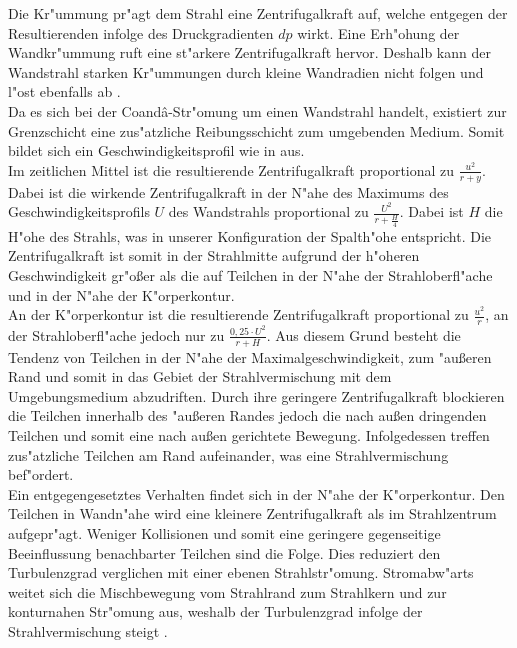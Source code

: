 Die Kr"ummung pr"agt dem Strahl eine Zentrifugalkraft auf, welche entgegen der Resultierenden infolge des Druckgradienten $dp$ wirkt. Eine Erh"ohung der Wandkr"ummung ruft eine st"arkere Zentrifugalkraft hervor. Deshalb kann der Wandstrahl starken Kr"ummungen durch kleine Wandradien nicht folgen und l"ost ebenfalls ab \cite{Riedel.1971}.\\
Da es sich bei der Coand\^{a}-Str"omung um einen Wandstrahl handelt, existiert zur Grenzschicht eine zus"atzliche Reibungsschicht zum umgebenden Medium. Somit bildet sich ein Geschwindigkeitsprofil wie in  aus.\\
Im zeitlichen Mittel ist die resultierende Zentrifugalkraft proportional zu $\frac{u^2}{r+y}$. Dabei ist die wirkende Zentrifugalkraft in der N"ahe des Maximums des Geschwindigkeitsprofils $U$ des Wandstrahls proportional zu $\frac{U^2}{r+\frac{H}{4}}$. Dabei ist $H$ die H"ohe des Strahls, was in unserer Konfiguration der Spalth"ohe entspricht. Die Zentrifugalkraft ist somit in der Strahlmitte aufgrund der h"oheren Geschwindigkeit gr"o\ss{}er als die auf Teilchen in der N"ahe der Strahloberfl"ache und in der N"ahe der K"orperkontur.\\
An der K"orperkontur ist die resultierende Zentrifugalkraft proportional zu $\frac{u^2}{r}$, an der Strahloberfl"ache jedoch nur zu $\frac{0,25 \cdot U^2}{r + H}$. Aus diesem Grund besteht die Tendenz von Teilchen in der N"ahe der Maximalgeschwindigkeit, zum "au\ss{}eren Rand und somit in das Gebiet der Strahlvermischung mit dem Umgebungsmedium abzudriften. Durch ihre geringere Zentrifugalkraft blockieren die Teilchen innerhalb des "au\ss{}eren Randes jedoch die nach au\ss{}en dringenden Teilchen und somit eine nach au\ss{}en gerichtete Bewegung. Infolgedessen treffen zus"atzliche Teilchen am Rand aufeinander, was eine Strahlvermischung bef"ordert.\\
Ein entgegengesetztes Verhalten findet sich in der N"ahe der K"orperkontur. Den Teilchen in Wandn"ahe wird eine kleinere Zentrifugalkraft als im Strahlzentrum aufgepr"agt. Weniger Kollisionen und somit eine geringere gegenseitige Beeinflussung benachbarter Teilchen sind die Folge. Dies reduziert den Turbulenzgrad verglichen mit einer ebenen Strahlstr"omung.
Stromabw"arts weitet sich die Mischbewegung vom Strahlrand zum Strahlkern und zur konturnahen Str"omung aus, weshalb der Turbulenzgrad infolge der Strahlvermischung steigt \cite{Riedel.1973}.

